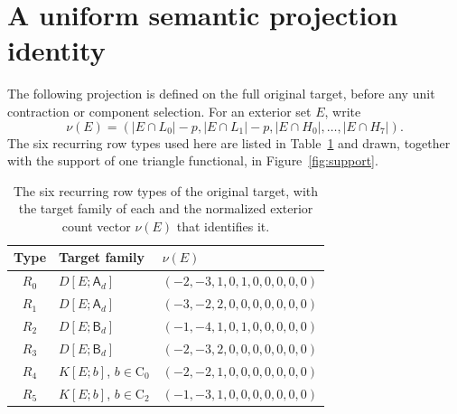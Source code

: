 \documentclass[11pt]{article}
\theoremstyle{definition}
\theoremstyle{remark}
\begin{document}
\section{A uniform semantic projection identity}\label{sec:projection}

The following projection is defined on the full original target, before any
unit contraction or component selection. For an exterior set $E$, write
\[
 \nu(E)=(|E\cap L_0|-p,|E\cap L_1|-p,
          |E\cap H_0|,\ldots,|E\cap H_7|).
\]
The six recurring row types used here are listed in Table~\ref{tab:rowtypes}
and drawn, together with the support of one triangle functional, in
Figure~\ref{fig:support}.
\begin{table}[t]
\centering\small
\begin{tabular}{cll}
\toprule
Type & Target family & $\nu(E)$\\
\midrule
$R_0$ & $D[E;\mathsf A_d]$ & $(-2,-3,1,0,1,0,0,0,0,0)$\\
$R_1$ & $D[E;\mathsf A_d]$ & $(-3,-2,2,0,0,0,0,0,0,0)$\\
$R_2$ & $D[E;\mathsf B_d]$ & $(-1,-4,1,0,1,0,0,0,0,0)$\\
$R_3$ & $D[E;\mathsf B_d]$ & $(-2,-3,2,0,0,0,0,0,0,0)$\\
$R_4$ & $K[E;b]$, $b\in\mathrm C_0$ & $(-2,-2,1,0,0,0,0,0,0,0)$\\
$R_5$ & $K[E;b]$, $b\in\mathrm C_2$ & $(-1,-3,1,0,0,0,0,0,0,0)$\\
\bottomrule
\end{tabular}
\caption{The six recurring row types of the original target, with the target family of each and the
normalized exterior count vector $\nu(E)$ that identifies it.}
\label{tab:rowtypes}
\end{table}
\end{document}
